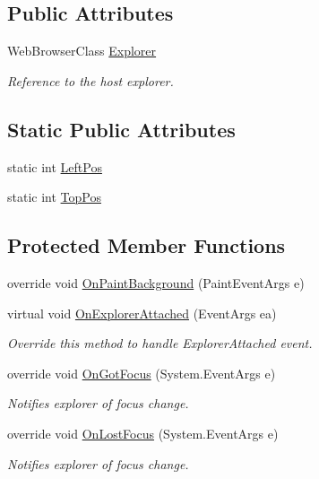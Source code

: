 \subsection*{Public Attributes}
\begin{DoxyCompactItemize}
\item 
Web\+Browser\+Class \hyperlink{class_band_objects_lib_1_1_band_object_a8805a88cc861498b7d88829ac6ccc0ba}{Explorer}
\begin{DoxyCompactList}\small\item\em Reference to the host explorer. \end{DoxyCompactList}\end{DoxyCompactItemize}
\subsection*{Static Public Attributes}
\begin{DoxyCompactItemize}
\item 
static int \hyperlink{class_band_objects_lib_1_1_band_object_ac413df7ebdffa4887df316061eb62798}{Left\+Pos}
\item 
static int \hyperlink{class_band_objects_lib_1_1_band_object_a9bb586edc1bf9760640d5ad5f2f13664}{Top\+Pos}
\end{DoxyCompactItemize}
\subsection*{Protected Member Functions}
\begin{DoxyCompactItemize}
\item 
override void \hyperlink{class_band_objects_lib_1_1_band_object_a55574dfd68827ca7dbc66eeae1f338a1}{On\+Paint\+Background} (Paint\+Event\+Args e)
\item 
virtual void \hyperlink{class_band_objects_lib_1_1_band_object_ade884056e9a78a001abbc6b706288818}{On\+Explorer\+Attached} (Event\+Args ea)
\begin{DoxyCompactList}\small\item\em Override this method to handle Explorer\+Attached event. \end{DoxyCompactList}\item 
override void \hyperlink{class_band_objects_lib_1_1_band_object_abf0a151f406a5f01dee279879c8cf170}{On\+Got\+Focus} (System.\+Event\+Args e)
\begin{DoxyCompactList}\small\item\em Notifies explorer of focus change. \end{DoxyCompactList}\item 
override void \hyperlink{class_band_objects_lib_1_1_band_object_a1ac0b492f4ae0c36d25ca3c9fcc991f9}{On\+Lost\+Focus} (System.\+Event\+Args e)
\begin{DoxyCompactList}\small\item\em Notifies explorer of focus change. \end{DoxyCompactList}\end{DoxyCompactItemize}
